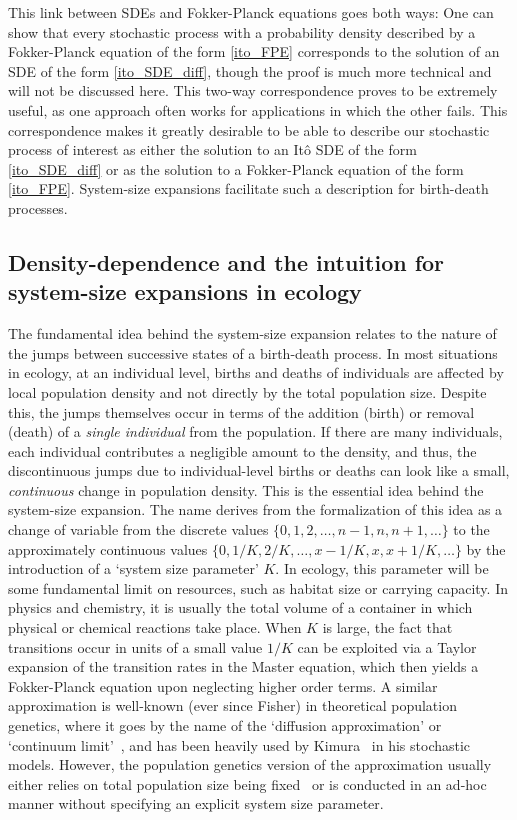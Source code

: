 This link between SDEs and Fokker-Planck equations goes both ways: One can show that every stochastic process with a probability density described by a Fokker-Planck equation of the form \eqref{ito_FPE} corresponds to the solution of an SDE of the form \eqref{ito_SDE_diff}, though the proof is much more technical and will not be discussed here. This two-way correspondence proves to be extremely useful, as one approach often works for applications in which the other fails. This correspondence makes it greatly desirable to be able to describe our stochastic process of interest as either the solution to an It\^o SDE of the form \eqref{ito_SDE_diff} or as the solution to a Fokker-Planck equation of the form \eqref{ito_FPE}. System-size expansions facilitate such a description for birth-death processes.

\subsection{Density-dependence and the intuition for system-size expansions in ecology}
The fundamental idea behind the system-size expansion relates to the nature of the jumps between successive states of a birth-death process. In most situations in ecology, at an individual level, births and deaths of individuals are affected by local population density and not directly by the total population size. Despite this, the jumps themselves occur in terms of the addition (birth) or removal (death) of a \emph{single individual} from the population. If there are many individuals, each individual contributes a negligible amount to the density, and thus, the discontinuous jumps due to individual-level births or deaths can look like a small, \emph{continuous} change in population density. This is the essential idea behind the system-size expansion. The name derives from the formalization of this idea as a change of variable from the discrete values $\{0,1,2,\ldots,n-1,n,n+1,\ldots\}$ to the approximately continuous values $\{0,1/K,2/K,\dots,x-1/K,x,x+1/K,\ldots\}$ by the introduction of a `system size parameter' $K$. In ecology, this parameter will be some fundamental limit on resources, such as habitat size or carrying capacity. In physics and chemistry, it is usually the total volume of a container in which physical or chemical reactions take place. When $K$ is large, the fact that transitions occur in units of a small value $1/K$ can be exploited via a Taylor expansion of the transition rates in the Master equation, which then yields a Fokker-Planck equation upon neglecting higher order terms. A similar approximation is well-known (ever since Fisher) in theoretical population genetics, where it goes by the name of the `diffusion approximation'\citep{ewens_mathematical_2004} or `continuum limit'~\citep{czuppon_understanding_2021}, and has been heavily used by Kimura~\citep{crow_introduction_1970} in his stochastic models. However, the population genetics version of the approximation usually either relies on total population size being fixed~\citep{crow_introduction_1970, lande_natural_1976,ewens_mathematical_2004} or is conducted in an ad-hoc manner without specifying an explicit system size parameter.

